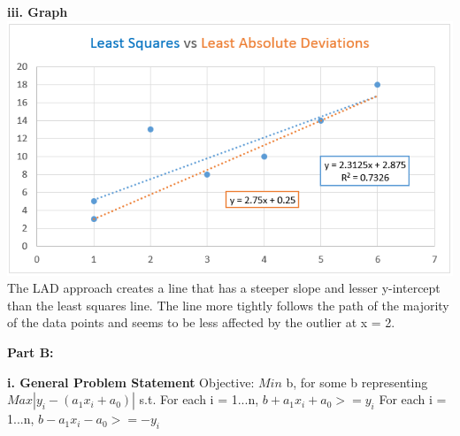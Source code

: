 \documentclass[paper=a4, fontsize=11pt]{scrartcl} %
\numberwithin{equation}{section} %
\numberwithin{figure}{section} %
\numberwithin{table}{section} %
\begin{document}
    \textbf{iii. Graph}\newline
    \includegraphics[width=\textwidth]{p3paiii}
    The LAD approach creates a line that has a steeper slope and lesser y-intercept than the least squares line. The line more tightly follows the path of the majority of the data points and seems to be less affected by the outlier at x = 2.\newline
    
\textbf{Part B:}
    
    \textbf{i. General Problem Statement}\newline
    Objective:\newline    
    $Min$ b, for some b representing $Max |y_i - (a_1x_i + a_0)|$\newline
    s.t.\newline
    For each i = 1...n, $b + a_1x_i + a_0 >= y_i$\newline
    For each i = 1...n, $b - a_1x_i - a_0 >= -y_i$\newline
    
\end{document}
